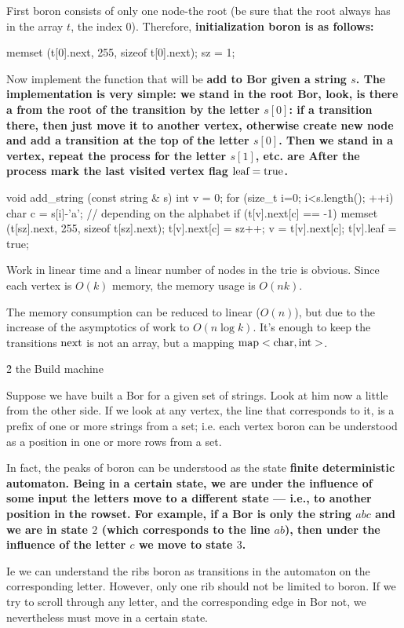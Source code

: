 First boron consists of only one node-the root (be sure that the root always has in the array $t$, the index $0$). Therefore, \bf{initialization} boron is as follows:

\code
memset (t[0].next, 255, sizeof t[0].next);
sz = 1;
\endcode

Now implement the function that will be \bf{add to Bor} given a string $s$. The implementation is very simple: we stand in the root Bor, look, is there a from the root of the transition by the letter $s[0]$: if a transition there, then just move it to another vertex, otherwise create new node and add a transition at the top of the letter $s[0]$. Then we stand in a vertex, repeat the process for the letter $s[1]$, etc. are After the process mark the last visited vertex flag $\rm leaf = true$.

\code
void add_string (const string & s) {
int v = 0;
for (size_t i=0; i<s.length(); ++i) {
char c = s[i]-'a'; // depending on the alphabet
if (t[v].next[c] == -1) {
memset (t[sz].next, 255, sizeof t[sz].next);
t[v].next[c] = sz++;
}
v = t[v].next[c];
}
t[v].leaf = true;
}
\endcode

Work in linear time and a linear number of nodes in the trie is obvious. Since each vertex is $O (k)$ memory, the memory usage is $O (n k)$.

The memory consumption can be reduced to linear ($O (n)$), but due to the increase of the asymptotics of work to $O (n \log k)$. It's enough to keep the transitions $\rm next$ is not an array, but a mapping $\rm map<char,int>$.


\h2{ the Build machine }

Suppose we have built a Bor for a given set of strings. Look at him now a little from the other side. If we look at any vertex, the line that corresponds to it, is a prefix of one or more strings from a set; i.e. each vertex boron can be understood as a position in one or more rows from a set.

In fact, the peaks of boron can be understood as the state \bf{finite deterministic automaton}. Being in a certain state, we are under the influence of some input the letters move to a different state --- i.e., to another position in the rowset. For example, if a Bor is only the string $abc$ and we are in state $2$ (which corresponds to the line $ab$), then under the influence of the letter $c$ we move to state $3$.

Ie we can understand the ribs boron as transitions in the automaton on the corresponding letter. However, only one rib should not be limited to boron. If we try to scroll through any letter, and the corresponding edge in Bor not, we nevertheless must move in a certain state.

